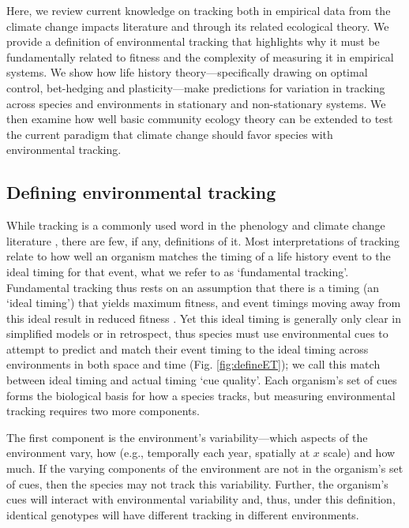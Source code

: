 \documentclass[11pt,letterpaper]{article}
\newcommand{\R}[1]{\label{#1}\linelabel{#1}}
\begin{document}
Here, we review current knowledge on tracking both in empirical data from the climate change impacts literature and through its related ecological theory. We provide a definition of environmental tracking that highlights why it must be fundamentally related to fitness and the complexity of measuring it in empirical systems. We show how life history theory---specifically drawing on optimal control, bet-hedging and plasticity---make predictions for variation in tracking across species and environments in stationary and non-stationary systems. We then examine how well basic community ecology theory can be extended to test the current paradigm that climate change should favor species with environmental tracking. 

\subsection{Defining environmental tracking}
\R{define1start} While tracking is a commonly used word in the phenology and climate change literature \citep[e.g.,][]{Menzel:2006xn,Cleland:2012,deacy2018}, there are few, if any, definitions of it. Most interpretations of tracking relate to how well an organism matches the timing of a life history event to the ideal timing for that event, what we refer to as `fundamental tracking'. Fundamental tracking thus rests on an assumption that there is a timing (an `ideal timing') that yields maximum fitness, and event timings moving away from this ideal result in reduced fitness \citep[a foundational concept of the trophic mismatch literature,][]{vissergienapp2019}. \R{tmm1}Yet this ideal timing is generally only clear in simplified models or in retrospect, thus species must use environmental cues to attempt to predict and match their event timing to the ideal timing across environments in both space and time (Fig. \ref{fig:defineET}); we call this match between ideal timing and actual timing `cue quality'. Each organism's set of cues forms the biological basis for how a species tracks, but measuring environmental tracking requires two more components.

The first component is the environment's variability---which aspects of the environment vary, how (e.g., temporally each year, spatially at $x$ scale) and how much. If the varying components of the environment are not in the organism's set of cues, then the species may not track this variability. Further, the organism's cues will interact with environmental variability and, thus, under this definition, identical genotypes will have different tracking in different environments.
\end{document}
